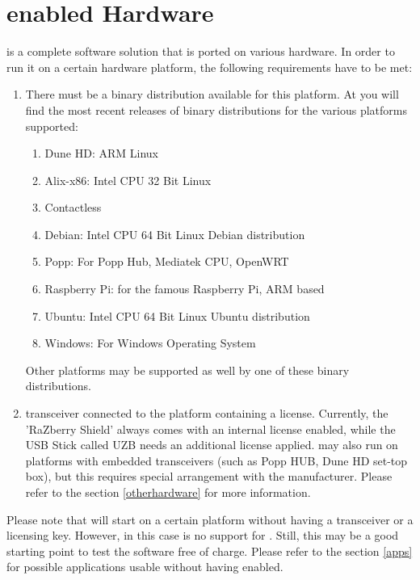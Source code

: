 \chapter{\zway enabled Hardware}

\zway is  a complete software solution that is ported on various hardware. In order to run 
it on a certain hardware platform, the following requirements have to be met:

\begin{enumerate}

\item There must be a binary \zway distribution available for this platform. At 
 you will find the most recent releases 
of \zway binary distributions for the various platforms supported:
	\begin{enumerate}
	\item Dune HD:  ARM Linux
	\item Alix-x86:  Intel CPU 32 Bit Linux
	\item Contactless
	\item Debian:  Intel CPU 64 Bit Linux Debian distribution
	\item Popp:  For Popp Hub, Mediatek CPU, OpenWRT
	\item Raspberry Pi: for the famous Raspberry Pi, ARM based
	\item Ubuntu: Intel CPU 64 Bit Linux Ubuntu distribution
	\item Windows: For Windows Operating System
	\end{enumerate}
Other platforms may be supported as well by one of these binary distributions.
\item \zwave transceiver connected to the platform containing a \zway license. Currently, 
the 'RaZberry Shield' always comes with an internal license enabled, while the USB Stick called UZB
needs an additional license applied. \zway may also run on platforms with embedded \zwave 
transceivers (such as Popp HUB, Dune HD set-top box), but this requires special 
arrangement with the manufacturer. Please refer to the section \ref{otherhardware} for 
more information.
\end{enumerate}

Please note that \zway will start on a certain platform without having a \zwave transceiver 
or a licensing key. However, in this case is no support for \zwave. Still, this may be a good 
starting point to test the software free of charge. Please refer to the section \ref{apps} 
for possible applications usable without having \zwave enabled.

